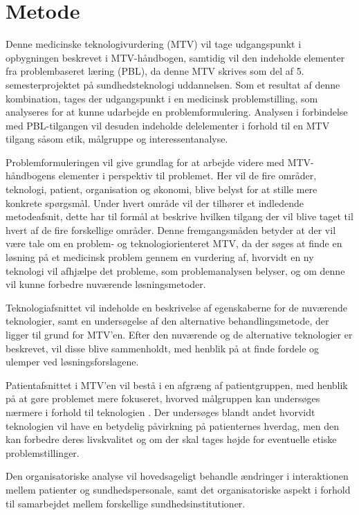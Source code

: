 \section{Metode} \label{metode}

Denne medicinske teknologivurdering (MTV) vil tage udgangspunkt i opbygningen beskrevet i MTV-håndbogen, samtidig vil den indeholde elementer fra problembaseret læring (PBL), da denne MTV skrives som del af 5. semesterprojektet på sundhedsteknologi uddannelsen. Som et resultat af denne kombination, tages der udgangspunkt i en medicinsk problemstilling, som analyseres for at kunne udarbejde en problemformulering. Analysen i forbindelse med PBL-tilgangen vil desuden indeholde delelementer i forhold til en MTV tilgang såsom etik, målgruppe og interessentanalyse.

Problemformuleringen vil give grundlag for at arbejde videre med MTV-håndbogens elementer i perspektiv til problemet. Her vil de fire områder, teknologi, patient, organisation og økonomi, blive belyst for at stille mere konkrete spørgsmål. Under hvert område vil der tilhører et indledende metodeafsnit, dette har til formål at beskrive hvilken tilgang der vil blive taget til hvert af de fire forskellige områder. Denne fremgangsmåden betyder at der vil være tale om en problem- og teknologiorienteret MTV, da der søges at finde en løsning på et medicinsk problem gennem en vurdering af, hvorvidt en ny teknologi vil afhjælpe det probleme, som problemanalysen belyser, og om denne vil kunne forbedre nuværende løsningsmetoder. 

Teknologiafsnittet vil indeholde en beskrivelse af egenskaberne for de nuværende teknologier, samt en undersøgelse af den alternative behandlingsmetode, der ligger til grund for MTV'en. Efter den nuværende og de alternative teknologier er beskrevet, vil disse blive sammenholdt, med henblik på at finde fordele og ulemper ved løsningsforslagene.

Patientafsnittet i MTV’en vil bestå i en afgræng af  patientgruppen, med henblik på at gøre problemet mere fokuseret, hvorved målgruppen kan undersøges nærmere  i forhold til teknologien . Der undersøges blandt andet hvorvidt teknologien vil have en betydelig påvirkning på patienternes hverdag, men den kan forbedre deres livskvalitet og om der skal tages højde for eventuelle etiske problemstillinger.

Den organisatoriske analyse vil hovedsageligt behandle ændringer i interaktionen mellem  patienter og sundhedspersonale, samt det organisatoriske aspekt i forhold til samarbejdet mellem forskellige sundhedsinstitutioner.

